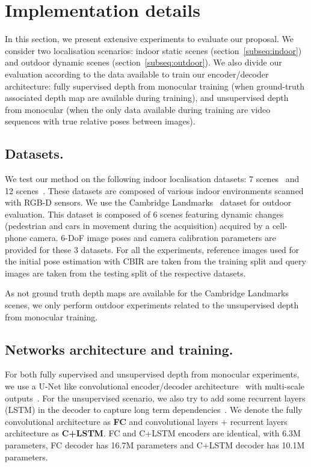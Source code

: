 \section{Implementation details}
\label{subseq:implementation}
In this section, we present extensive experiments to evaluate our proposal. We consider two localisation scenarios: indoor static scenes (section~\ref{subseq:indoor}) and outdoor dynamic scenes (section~\ref{subseq:outdoor}). We also divide our evaluation according to the data available to train our encoder/decoder architecture: fully supervised depth from monocular training (when ground-truth associated depth map are available during training), and unsupervised depth from monocular (when the only data available during training are video sequences with true relative poses between images).

\subsection{Datasets.} We test our method on the following indoor localisation datasets: 7 scenes~\citep{Shotton2013} and 12 scenes~\citep{Valentin2016}. These datasets are composed of various indoor environments scanned with RGB-D sensors. We use the Cambridge Landmarks~\citep{Kendall2015} dataset for outdoor evaluation. This dataset is composed of 6 scenes featuring dynamic changes (pedestrian and cars in movement during the acquisition) acquired by a cell-phone camera. 6-DoF image poses and camera calibration parameters are provided for these 3 datasets. For all the experiments, reference images used for the initial pose estimation with CBIR are taken from the training split and query images are taken from the testing split of the respective datasets.

As not ground truth depth maps are available for the Cambridge Landmarks scenes, we only perform outdoor experiments related to the unsupervised depth from monocular training.

\subsection{Networks architecture and training.} For both fully supervised and unsupervised depth from monocular experiments, we use a U-Net like convolutional encoder/decoder architecture~\citep{Isola2017} with multi-scale outputs~\citep{Godard2017}. For the unsupervised scenario, we also try to add some recurrent layers (LSTM) in the decoder to capture long term dependencies~\citep{Visin2015, Li2016b}. We denote the fully convolutional architecture as \textbf{FC} and convolutional layers + recurrent layers architecture as \textbf{C+LSTM}. FC and C+LSTM encoders are identical, with 6.3M parameters, FC decoder has 16.7M parameters and C+LSTM decoder has 10.1M parameters.

